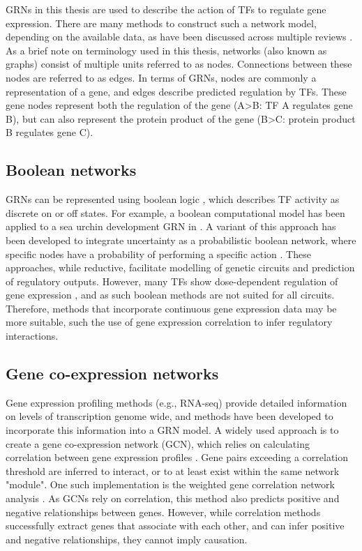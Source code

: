 GRNs in this thesis are used to describe the action of TFs to regulate gene expression. There are many methods to construct such a network model, depending on the available data, as have been discussed across multiple reviews \citep{karlebach_modelling_2008, hecker_gene_2009, emmert-streib_gene_2014, mercatelli_gene_2020}. As a brief note on terminology used in this thesis, networks (also known as graphs) consist of multiple units referred to as nodes. Connections between these nodes are referred to as edges. In terms of GRNs, nodes are commonly a representation of a gene, and edges describe predicted regulation by TFs. These gene nodes represent both the regulation of the gene (A>B: TF A regulates gene B), but can also represent the protein product of the gene (B>C: protein product B regulates gene C).

\subsection{Boolean networks}

GRNs can be represented using boolean logic \citep{thomas_boolean_1973}, which describes TF activity as discrete on or off states. For example, a boolean computational model has been applied to a sea urchin development GRN in \cite{peter_predictive_2012}. A variant of this approach has been developed to integrate uncertainty as a probabilistic boolean network, where specific nodes have a probability of performing a specific action \citep{shmulevich_probabilistic_2002}. These approaches, while reductive, facilitate modelling of genetic circuits and prediction of regulatory outputs. However, many TFs show dose-dependent regulation of gene expression \citep{scripture-adams_gata-3_2014, mak_pu1_2011, lie-a-ling_regulation_2018}, and as such boolean methods are not suited for all circuits. Therefore, methods that incorporate continuous gene expression data may be more suitable, such the use of gene expression correlation to infer regulatory interactions. 

\subsection{Gene co-expression networks}

Gene expression profiling methods (e.g., RNA-seq) provide detailed information on levels of transcription genome wide, and methods have been developed to incorporate this information into a GRN model. A widely used approach is to create a gene co-expression network (GCN), which relies on calculating correlation between gene expression profiles \citep{serin_learning_2016}. Gene pairs exceeding a correlation threshold are inferred to interact, or to at least exist within the same network "module". One such implementation is the weighted gene correlation network analysis \citep{langfelder_wgcna_2008}. As GCNs rely on correlation, this method also predicts positive and negative relationships between genes. However, while correlation methods successfully extract genes that associate with each other, and can infer positive and negative relationships, they cannot imply causation.

